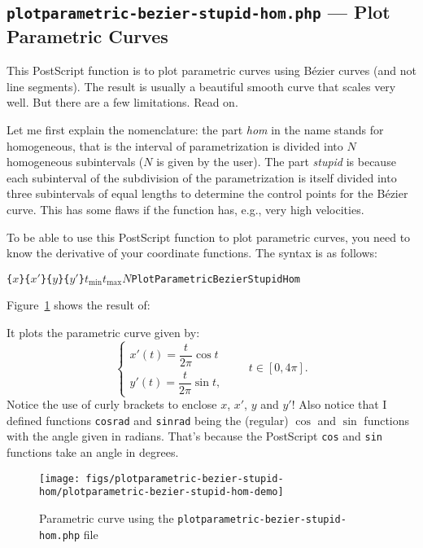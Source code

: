\documentclass[10pt,a4paper]{scrartcl}
\newcommand\PS{PostScript}
\begin{document}
\subsection{\texttt{plotparametric-bezier-stupid-hom.php} --- Plot Parametric Curves}
\label{ssec:plotparametric-bezier-stupid-hom.php}
This \PS{} function is to plot parametric curves using B\'ezier curves (and not
line segments). The result is usually a beautiful smooth curve that scales very
well. But there are a few limitations. Read on.

Let me first explain the nomenclature: the part \emph{hom} in the name stands
for homogeneous, that is the interval of parametrization is divided into $N$
homogeneous subintervals ($N$ is given by the user). The part \emph{stupid} is
because each subinterval of the subdivision of the parametrization is itself
divided into three subintervals of equal lengths to determine the control
points for the B\'ezier curve. This has some flaws if the function has, e.g.,
very high velocities.

To be able to use this \PS{} function to plot parametric curves, you need to
know the derivative of your coordinate functions. The syntax is as follows:
\begin{center}
\texttt{\{}$x$\texttt{\}}\quad\texttt{\{}$x'$\texttt{\}}\quad\texttt{\{}$y$\texttt{\}}\quad\texttt{\{}$y'$\texttt{\}}\quad$t_{\text{min}}$\quad$t_{\text{max}}$\quad$N$\quad\texttt{PlotParametricBezierStupidHom}
\end{center}

Figure~\ref{fig:plotparametric-bezier-stupid-hom-demo} shows the result of:

It plots the parametric curve given by:
\[\begin{cases}
x'(t)=\dfrac t{2\pi}\cos t\\
y'(t)=\dfrac t{2\pi}\sin t,
\end{cases}\qquad t\in[0,4\pi].\]
Notice the use of curly brackets to enclose $x$, $x'$, $y$ and $y'$! Also notice that I
defined functions \texttt{cosrad} and \texttt{sinrad} being the (regular)
$\cos$ and $\sin$ functions with the angle given in radians. That's because the
\PS{} \texttt{cos} and \texttt{sin} functions take an angle in degrees.

\begin{figure}[ht!]%
\centering
\texttt{[image: figs/plotparametric-bezier-stupid-hom/plotparametric-bezier-stupid-hom-demo]}%
\caption{Parametric curve using the \texttt{plotparametric-bezier-stupid-hom.php} file}%
\label{fig:plotparametric-bezier-stupid-hom-demo}%
\end{figure}
\end{document}
